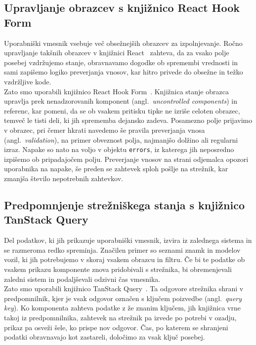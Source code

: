 \documentclass[a4paper,12pt,openright]{book}
\begin{document}
\subsection{Upravljanje obrazcev s knjižnico React Hook Form}
Uporabniški vmesnik vsebuje več obsežnejših obrazcev za izpolnjevanje. Ročno upravljanje takšnih
obrazcev v knjižnici React~\cite{react-docs} zahteva, da za vsako polje posebej vzdržujemo stanje, obravnavamo
dogodke ob spremembi vrednosti in sami zapišemo logiko preverjanja vnosov, kar hitro privede
do obsežne in težko vzdržljive kode.\\
 Zato smo uporabili knjižnico React Hook Form~\cite{react-hook-form-docs}.
Knjižnica stanje obrazca upravlja prek nenadzorovanih komponent (angl.\ \textit{uncontrolled
components}) in referenc, kar pomeni, da se ob vsakem pritisku tipke ne izriše celoten obrazec,
temveč le tisti deli, ki jih sprememba dejansko zadeva. Posamezno polje prijavimo v obrazec,
 pri čemer hkrati navedemo še pravila preverjanja vnosa (angl.\
\textit{validation}), na primer obveznost polja, najmanjšo dolžino ali regularni izraz. Napake
so nato na voljo v objektu \texttt{errors}, iz katerega jih neposredno izpišemo ob pripadajočem
polju. Preverjanje vnosov na strani odjemalca opozori uporabnika na napake, še preden se
zahtevek sploh pošlje na strežnik, kar zmanjša število nepotrebnih zahtevkov.

\subsection{Predpomnjenje strežniškega stanja s knjižnico TanStack Query}
Del podatkov, ki jih prikazuje uporabniški vmesnik, izvira iz zalednega sistema in se
razmeroma redko spreminja. Značilen primer so seznami znamk in modelov vozil, ki jih
potrebujemo v skoraj vsakem obrazcu in filtru. Če bi te podatke ob vsakem prikazu komponente
znova pridobivali s strežnika, bi obremenjevali zaledni sistem in podaljševali
odzivni čas vmesnika.\\
Zato smo uporabili knjižnico TanStack Query~\cite{tanstack-query-docs}. Ta odgovore strežnika shrani v predpomnilnik,
 kjer je vsak odgovor označen s ključem poizvedbe (angl.\ \textit{query
key}). Ko komponenta zahteva podatke z že znanim ključem, jih knjižnica vrne takoj iz
predpomnilnika, zahtevek na strežnik pa izvede po potrebi v ozadju, prikaz pa osveži šele, ko
prispe nov odgovor. Čas, po katerem se shranjeni podatki obravnavajo kot zastareli, določimo za vsak ključ posebej.
\end{document}
